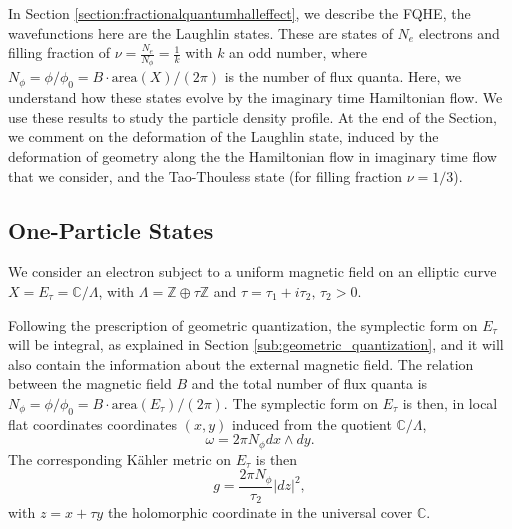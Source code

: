 \documentclass[a4paper,11pt]{article}
\newcommand{\C}{\mathbb{C}}
\begin{document}
In Section \ref{section:fractionalquantumhalleffect}, we describe the FQHE, the wavefunctions here are the Laughlin states. These are states of $N_{e}$ electrons and filling fraction of $\nu=\frac{N_{e}}{N_{\phi}}=\frac{1}{k}$ with $k$ an odd number, where $N_{\phi} = \phi/\phi_{0} = B\cdot \mathrm{area}(X)/(2\pi)$ is the number of flux quanta. Here, we understand how these states evolve by the imaginary time Hamiltonian flow. We use these results to study the particle density profile. At the end of the Section, we comment on the deformation of the Laughlin state, induced by the deformation of geometry along the the Hamiltonian flow in imaginary time flow that we consider, and the Tao-Thouless state (for filling fraction $\nu= 1/3$).

\subsection{One-Particle States}
\label{section:oneparticlestates}

We consider an electron subject to a uniform magnetic field on an elliptic curve $X=E_{\tau}=\mathbb{C}/\Lambda$, with $\Lambda = \mathbb{Z}\oplus \tau\mathbb{Z}$ and $\tau=\tau_{1}+i\tau_{2},\, \tau_2>0$. 

Following the prescription of geometric quantization, the symplectic form on $E_{\tau}$ will be integral, as explained in Section \ref{sub:geometric_quantization}, and it will also contain the information about the external magnetic field. The relation between the magnetic field $B$ and the total number of flux quanta is $N_{\phi}=\phi/\phi_{0} = B\cdot \mathrm{area}(E_\tau)/(2\pi)$. The symplectic form on $E_{\tau}$ is then, in local flat coordinates coordinates $(x,y)$ induced from the quotient $\C/\Lambda$, $$\omega = 2\pi N_{\phi}dx\wedge dy.$$ The corresponding K\"ahler metric on $E_\tau$ is then $$g = \frac{2\pi N_{\phi}}{\tau_{2}}|dz|^2,$$ with $z=x+\tau y$ the holomorphic coordinate in the universal cover $\mathbb{C}$. 
\end{document}
